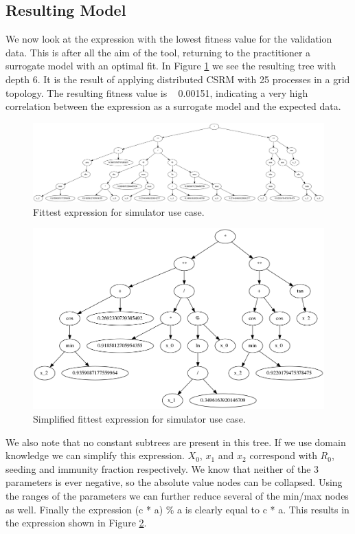 \subsection{Resulting Model}
We now look at the expression with the lowest fitness value for the validation data. This is after all the aim of the tool, returning to the practitioner a surrogate model with an optimal fit. In Figure \ref{fig:bestusecase} we see the resulting tree with depth 6. It is the result of applying distributed CSRM with 25 processes in a grid topology. The resulting fitness value is ~ 0.00151, indicating a very high correlation between the expression as a  surrogate model and the expected data. 
\begin{figure}
    \centering
    \includegraphics[width=\textwidth,height=\textheight,keepaspectratio]{figures/bestusecase.png}
    \caption{Fittest expression for simulator use case.}
    \label{fig:bestusecase}
\end{figure}
\begin{figure}
    \centering
    \includegraphics[width=\textwidth,height=\textheight,keepaspectratio]{figures/bestusecasesimple.png}
    \caption{Simplified fittest expression for simulator use case.}
    \label{fig:bestusecasesimple}
\end{figure}
We also note that no constant subtrees are present in this tree. If we use domain knowledge we can simplify this expression. $X_0$, $x_1$ and $x_2$ correspond with $R_0$, seeding and immunity fraction respectively. We know that neither of the 3 parameters is ever negative, so the absolute value nodes can be collapsed. Using the ranges of the parameters we can further reduce several of the min/max nodes as well. Finally the expression (c * a) \% a is clearly equal to c * a. This results in the expression shown in Figure \ref{fig:bestusecasesimple}. 
